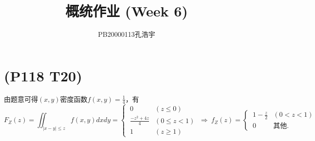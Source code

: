 \documentclass{article}
\title{概统作业 (Week 6)}
\author{PB20000113孔浩宇}
\begin{document}
\maketitle
\section{(P118 T20)}  %
由题意可得$(x,y)$密度函数$f(x,y)=\displaystyle{\frac{1}{4}}$，有
\[
    F_Z (z)
    = \iint _{|x-y|\leq z} f(x,y) dx dy
    =  
    \begin{cases}
        \ 0 & (z\leq 0)\\ 
        \ \displaystyle{\frac{- z^2 + 4z}{4}} & (0\leq z <1)\\
        \ 1 & (z\geq 1)
    \end{cases}
    \ \Rightarrow\ 
    f_Z (z)
    =
    \begin{cases}
        \ 1 - \displaystyle{\frac{z}{2}} & (0<z<1)\\
        \ 0 & \mbox{其他.}
    \end{cases} 
\]
\end{document}
